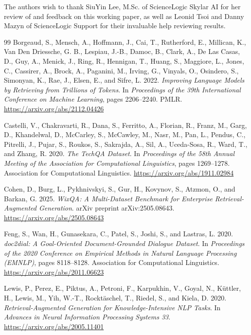 \documentclass[11pt]{article}
\begin{document}
The authors wish to thank SiuYin Lee, M.Sc. of ScienceLogic Skylar AI
for her review of and feedback on this working paper, as well as Leonid
Tsoi and Danny Mazyn of ScienceLogic Support for their invaluable help
reviewing results.

\begin{thebibliography}{99}
Borgeaud, S., Mensch, A., Hoffmann, J., Cai, T., Rutherford, E., Millican, K., Van Den Driessche, G. B., Lespiau, J.-B., Damoc, B., Clark, A., De Las Casas, D., Guy, A., Menick, J., Ring, R., Hennigan, T., Huang, S., Maggiore, L., Jones, C., Cassirer, A., Brock, A., Paganini, M., Irving, G., Vinyals, O., Osindero, S., Simonyan, K., Rae, J., Elsen, E., and Sifre, L. 2022. \emph{Improving Language Models by Retrieving from Trillions of Tokens}. In \emph{Proceedings of the 39th International Conference on Machine Learning}, pages 2206--2240. PMLR. \url{https://arxiv.org/abs/2112.04426}

Castelli, V., Chakravarti, R., Dana, S., Ferritto, A., Florian, R., Franz, M., Garg, D., Khandelwal, D., McCarley, S., McCawley, M., Nasr, M., Pan, L., Pendus, C., Pitrelli, J., Pujar, S., Roukos, S., Sakrajda, A., Sil, A., Uceda-Sosa, R., Ward, T., and Zhang, R. 2020. \emph{The TechQA Dataset}. In \emph{Proceedings of the 58th Annual Meeting of the Association for Computational Linguistics}, pages 1269--1278. Association for Computational Linguistics. \url{https://arxiv.org/abs/1911.02984}

Cohen, D., Burg, L., Pykhnivskyi, S., Gur, H., Kovynov, S., Atzmon, O., and Barkan, G. 2025. \emph{WixQA: A Multi-Dataset Benchmark for Enterprise Retrieval-Augmented Generation}. arXiv preprint arXiv:2505.08643. \url{https://arxiv.org/abs/2505.08643}

Feng, S., Wan, H., Gunasekara, C., Patel, S., Joshi, S., and Lastras, L. 2020. \emph{doc2dial: A Goal-Oriented Document-Grounded Dialogue Dataset}. In \emph{Proceedings of the 2020 Conference on Empirical Methods in Natural Language Processing (EMNLP)}, pages 8118--8128. Association for Computational Linguistics. \url{https://arxiv.org/abs/2011.06623}

Lewis, P., Perez, E., Piktus, A., Petroni, F., Karpukhin, V., Goyal, N., Küttler, H., Lewis, M., Yih, W.-T., Rocktäschel, T., Riedel, S., and Kiela, D. 2020. \emph{Retrieval-Augmented Generation for Knowledge-Intensive NLP Tasks}. In \emph{Advances in Neural Information Processing Systems 33}. \url{https://arxiv.org/abs/2005.11401}


\end{thebibliography}
\end{document}
